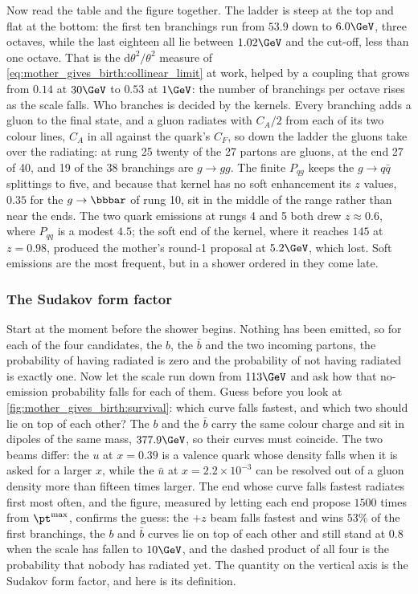 Now read the table and the figure together. The ladder is steep at the top
and flat at the bottom: the first ten branchings run from $53.9$ down to
$6.0\GeV$, three octaves, while the last eighteen all lie between
$1.02\GeV$ and the cut-off, less than one octave. That is the
$\mathrm{d}\theta^2/\theta^2$ measure of
\cref{eq:mother_gives_birth:collinear_limit} at work, helped by a coupling
that grows from $0.14$ at $30\GeV$ to $0.53$ at $1\GeV$: the number of
branchings per octave rises as the scale falls. Who branches is decided by
the kernels. Every branching adds a gluon to the final state, and a gluon
radiates with $C_A/2$ from each of its two colour lines, $C_A$ in all
against the quark's $C_F$, so
down the ladder the gluons take over the radiating: at rung 25 twenty of
the 27 partons are gluons, at the end 27 of 40, and 19 of the 38
branchings are $g\to gg$. The finite $P_{qg}$ keeps the $g\to q\bar q$
splittings to five, and because that kernel has no soft enhancement its
$z$ values, $0.35$ for the $g\to\bbbar$ of rung 10, sit in the middle of
the range rather than near the ends. The two quark emissions at rungs 4
and 5 both drew $z\approx0.6$, where $P_{qq}$ is a modest $4.5$; the soft
end of the kernel, where it reaches $145$ at $z=0.98$, produced the
mother's round-1 proposal at $5.2\GeV$, which lost. Soft emissions are the
most frequent, but in a shower ordered in \pt they come late.

\subsubsection{The Sudakov form factor}
\label{sec:mother_gives_birth:sudakov}

Start at the moment before the shower begins. Nothing has been emitted, so
for each of the four candidates, the $b$, the $\bar b$ and the two incoming
partons, the probability of having radiated is zero and the probability of
not having radiated is exactly one. Now let the scale run down from
$113\GeV$ and ask how that no-emission probability falls for each of them.
Guess before you look at \cref{fig:mother_gives_birth:survival}: which
curve falls fastest, and which two should lie on top of each other? The
$b$ and the $\bar b$ carry the same colour charge and sit in dipoles of the
same mass, $377.9\GeV$, so their curves must coincide. The two beams
differ: the $u$ at $x=0.39$ is a valence quark whose density falls when it
is asked for a larger $x$, while the $\bar u$ at $x=2.2\times10^{-3}$ can
be resolved out of a gluon density more than fifteen times larger. The end
whose curve falls fastest radiates first most often, and the figure,
measured by letting each end propose $1500$ times from $\pt^{\max}$,
confirms the guess: the $+z$ beam falls fastest and wins $53\%$ of the
first branchings, the $b$ and $\bar b$ curves lie on top of each other and
still stand at $0.8$ when the scale has fallen to $10\GeV$, and the dashed
product of all four is the probability that nobody has radiated yet. The
quantity on the vertical axis is the Sudakov form factor, and here is its
definition.

